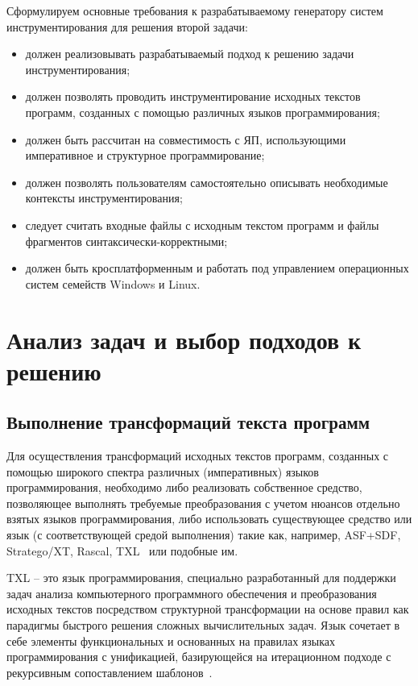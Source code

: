 Сформулируем основные требования к разрабатываемому генератору систем инструментирования для решения второй задачи:
\begin{itemize}[noitemsep]
  \item должен реализовывать разрабатываемый подход к решению задачи инструментирования;
  \item должен позволять проводить инструментирование исходных текстов программ, созданных с помощью различных языков программирования;
  \item должен быть рассчитан на совместимость с ЯП, использующими императивное и структурное программирование;
  \item должен позволять пользователям самостоятельно описывать необходимые контексты инструментирования;
  \item следует считать входные файлы с исходным текстом программ и файлы фрагментов синтаксически-корректными;
  \item должен быть кросплатформенным и работать под управлением операционных систем семейств Windows и Linux.
\end{itemize}

\section{Анализ задач и выбор подходов к решению}

\subsection{Выполнение трансформаций текста программ}

Для осуществления трансформаций исходных текстов программ, созданных с помощью широкого спектра различных (императивных) языков программирования, необходимо либо реализовать собственное средство, позволяющее выполнять требуемые преобразования с учетом нюансов отдельно взятых языков программирования, либо использовать существующее средство или язык (с соответствующей средой выполнения) такие как, например, ASF+SDF, Stratego/XT, Rascal, TXL~\cite{cordy2009eating} или подобные им.

TXL -- это язык программирования, специально разработанный для поддержки задач анализа компьютерного программного обеспечения и преобразования исходных текстов посредством структурной трансформации на основе правил как парадигмы быстрого решения сложных вычислительных задач.
Язык сочетает в себе элементы функциональных и основанных на правилах языках программирования с унификацией, базирующейся на итерационном  подходе с рекурсивным сопоставлением шаблонов~\cite{txl-about}.

